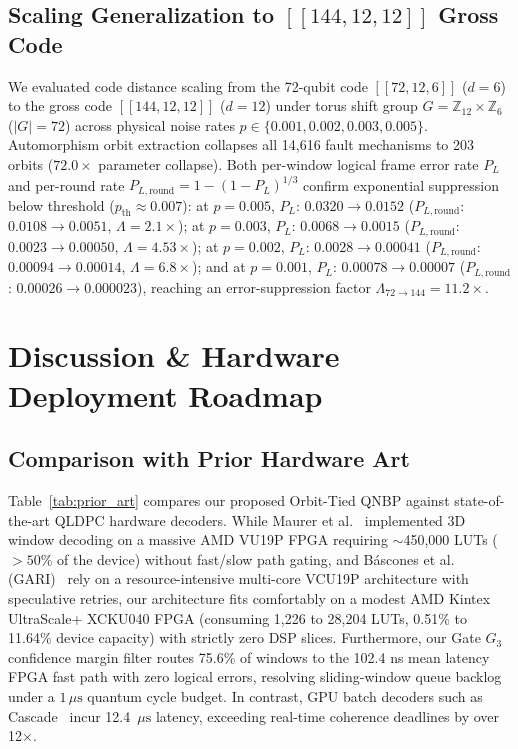 \documentclass[journal]{IEEEtran}
\begin{document}
\subsection{Scaling Generalization to $[[144, 12, 12]]$ Gross Code}
We evaluated code distance scaling from the 72-qubit code $[[72, 12, 6]]$ ($d=6$) to the gross code $[[144, 12, 12]]$ ($d=12$) under torus shift group $G = \mathbb{Z}_{12} \times \mathbb{Z}_6$ ($|G| = 72$) across physical noise rates $p \in \{0.001, 0.002, 0.003, 0.005\}$. Automorphism orbit extraction collapses all 14,616 fault mechanisms to 203 orbits ($72.0\times$ parameter collapse). Both per-window logical frame error rate $P_L$ and per-round rate $P_{L,\text{round}} = 1 - (1 - P_L)^{1/3}$ confirm exponential suppression below threshold ($p_{\text{th}} \approx 0.007$): at $p = 0.005$, $P_L$: $0.0320 \to 0.0152$ ($P_{L,\text{round}}$: $0.0108 \to 0.0051$, $\Lambda = 2.1\times$); at $p = 0.003$, $P_L$: $0.0068 \to 0.0015$ ($P_{L,\text{round}}$: $0.0023 \to 0.00050$, $\Lambda = 4.53\times$); at $p = 0.002$, $P_L$: $0.0028 \to 0.00041$ ($P_{L,\text{round}}$: $0.00094 \to 0.00014$, $\Lambda = 6.8\times$); and at $p = 0.001$, $P_L$: $0.00078 \to 0.00007$ ($P_{L,\text{round}}$: $0.00026 \to 0.000023$), reaching an error-suppression factor $\Lambda_{72\to 144} = 11.2\times$.

\section{Discussion \& Hardware Deployment Roadmap}

\subsection{Comparison with Prior Hardware Art}



Table~\ref{tab:prior_art} compares our proposed Orbit-Tied QNBP against state-of-the-art QLDPC hardware decoders. While Maurer et al.~\cite{maurer2025fpga} implemented 3D window decoding on a massive AMD VU19P FPGA requiring $\sim$450,000 LUTs ($>50\%$ of the device) without fast/slow path gating, and B{\'a}scones et al. (GARI)~\cite{cowtan2024modular} rely on a resource-intensive multi-core VCU19P architecture with speculative retries, our architecture fits comfortably on a modest AMD Kintex UltraScale+ XCKU040 FPGA (consuming 1,226 to 28,204 LUTs, 0.51\% to 11.64\% device capacity) with strictly zero DSP slices. Furthermore, our Gate $G_3$ confidence margin filter routes 75.6\% of windows to the 102.4 ns mean latency FPGA fast path with zero logical errors, resolving sliding-window queue backlog under a $1\,\mu\text{s}$ quantum cycle budget. In contrast, GPU batch decoders such as Cascade~\cite{gu2026cascade} incur 12.4~$\mu\text{s}$ latency, exceeding real-time coherence deadlines by over 12$\times$.
\end{document}
